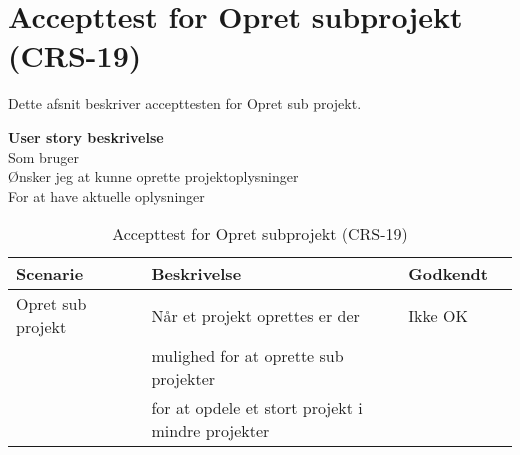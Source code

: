 \section{Accepttest for Opret subprojekt (CRS-19)}
Dette afsnit beskriver accepttesten for Opret sub projekt.

\textbf{User story beskrivelse} \\
Som bruger \\
Ønsker jeg at kunne oprette projektoplysninger \\
For at have aktuelle oplysninger

\begin{table}[H]
	\centering
	\begin{tabular}{|ll|l|ll|} \hline
		\textbf{Scenarie} &  & \textbf{Beskrivelse}&  \textbf{Godkendt}&  \\ \hline
		Opret sub projekt&  &  Når et projekt oprettes er der &  Ikke OK&  \\
		& & mulighed for at oprette sub projekter & & \\
		& & for at opdele et stort projekt i mindre projekter& & \\ \hline
	\end{tabular}
	\caption{Accepttest for Opret subprojekt (CRS-19)}
	\label{AcceptSubProjekt}
\end{table}